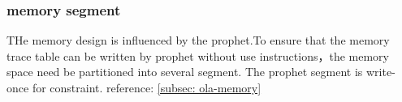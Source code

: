 \subsubsection{memory segment}
THe memory design is influenced by the prophet.To ensure that the memory trace table can be written by prophet without use instructions，the memory space need be partitioned into several segment.
The prophet segment is write-once for constraint. reference: \ref{subsec: ola-memory}